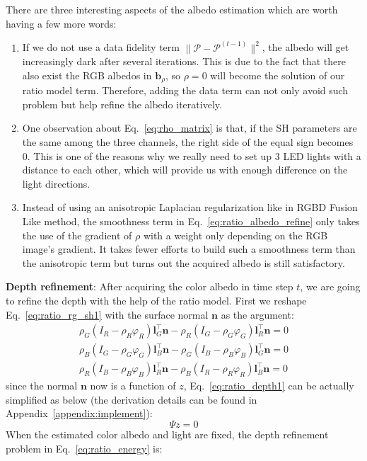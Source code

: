 There are three interesting aspects of the albedo estimation which are worth having a few more words:
\begin{enumerate}
    \item If we do not use a data fidelity term $\lVert \mathcal{P} - \mathcal{P}^{(t-1)}\rVert^2$, the albedo will get increasingly dark after several iterations. 
    This is due to the fact that there also exist the RGB albedos in $\mathbf{b}_{\rho}$, so $\rho = 0$ will become the solution of our ratio model term.
    Therefore, adding the data term can not only avoid such problem but help refine the albedo iteratively. 
    \item One observation about Eq.~\ref{eq:rho_matrix} is that, if the SH parameters are the same among the three channels, the right side of the equal sign becomes 0. 
    This is one of the reasons why we really need to set up 3 LED lights with a distance to each other, which will provide us with enough difference on the light directions.
    \item Instead of using an anisotropic Laplacian regularization like in RGBD Fusion Like method, the smoothness term in Eq.~\ref{eq:ratio_albedo_refine} only takes the use of the gradient of $\rho$ with a weight only depending on the RGB image's gradient.
    It takes fewer efforts to build such a smoothness term than the anisotropic term but turns out the acquired albedo is still satisfactory.
\end{enumerate}

\textbf{Depth refinement}:
After acquiring the color albedo in time step $t$, we are going to refine the depth with the help of the ratio model.
First we reshape Eq.~\ref{eq:ratio_rg_sh1} with the surface normal $\mathbf{n}$ as the argument:
\begin{equation}\label{eq:ratio_depth1}
\begin{split}
\rho_G (I_R - \rho_R \varphi_R)\mathbf{l}_G^\top \mathbf{n} - \rho_R (I_G - \rho_G \varphi_G)\mathbf{l}_R^\top\mathbf{n} = 0\\
\rho_B (I_G - \rho_G \varphi_G)\mathbf{l}_B^\top \mathbf{n} - \rho_G (I_B - \rho_B \varphi_B)\mathbf{l}_G^\top\mathbf{n} = 0\\
\rho_R (I_B - \rho_B \varphi_B)\mathbf{l}_R^\top \mathbf{n} - \rho_B (I_R - \rho_R \varphi_R)\mathbf{l}_B^\top\mathbf{n} = 0 
\end{split}
\end{equation}
since the normal $\mathbf{n}$ now is a function of $z$, Eq.~\ref{eq:ratio_depth1} can be actually simplified as below (the derivation details can be found in Appendix~\ref{appendix:implement}):
\begin{equation}\label{eq:psi}
    \Psi z = 0
\end{equation}
When the estimated color albedo and light are fixed, the depth refinement problem in Eq.~\ref{eq:ratio_energy} is:

